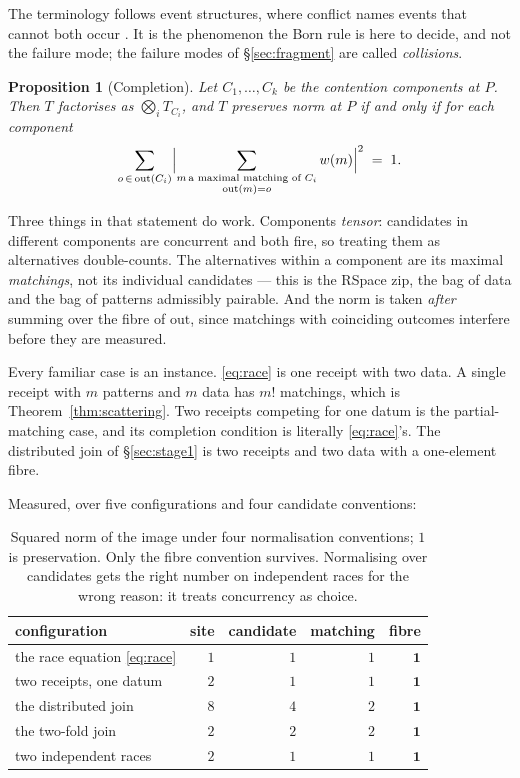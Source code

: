 \documentclass[11pt,a4paper]{article}
\theoremstyle{plain}
\newtheorem{proposition}[theorem]{Proposition}
\theoremstyle{definition}
\theoremstyle{remark}
\newcommand{\Out}{\mathrm{out}}
\begin{document}
The terminology follows event structures, where conflict names events that
cannot both occur \cite{Winskel}. It is the phenomenon the Born rule is here to
decide, and not the failure mode; the failure modes of \S\ref{sec:fragment} are
called \emph{collisions}.

\begin{proposition}[Completion]\label{prop:complete}
Let $C_1,\dots,C_k$ be the contention components at $P$. Then $T$ factorises as
$\bigotimes_i T_{C_i}$, and $T$ preserves norm at $P$ if and only if for each
component
\[
  \sum_{o \,\in\, \Out(C_i)}
  \Bigl| \sum_{\substack{m \,\text{a maximal matching of } C_i\\ \Out(m) = o}}
          w(m) \Bigr|^{2} \;=\; 1 .
\]
\end{proposition}

Three things in that statement do work. Components \emph{tensor}: candidates in
different components are concurrent and both fire, so treating them as
alternatives double-counts. The alternatives within a component are its maximal
\emph{matchings}, not its individual candidates --- this is the RSpace zip, the
bag of data and the bag of patterns admissibly pairable. And the norm is taken
\emph{after} summing over the fibre of $\Out$, since matchings with coinciding
outcomes interfere before they are measured.

Every familiar case is an instance. \eqref{eq:race} is one receipt with two
data. A single receipt with $m$ patterns and $m$ data has $m!$ matchings, which
is Theorem~\ref{thm:scattering}. Two receipts competing for one datum is the
partial-matching case, and its completion condition is literally
\eqref{eq:race}'s. The distributed join of \S\ref{sec:stage1} is two receipts
and two data with a one-element fibre.

Measured, over five configurations and four candidate conventions:

\begin{table}[h]
\centering\small
\begin{tabular}{@{}lrrrr@{}}
\toprule
configuration & site & candidate & matching & \textbf{fibre} \\
\midrule
the race equation \eqref{eq:race}     & $1$ & $1$ & $1$ & $\mathbf{1}$ \\
two receipts, one datum               & $2$ & $1$ & $1$ & $\mathbf{1}$ \\
the distributed join                  & $8$ & $4$ & $2$ & $\mathbf{1}$ \\
the two-fold join                     & $2$ & $2$ & $2$ & $\mathbf{1}$ \\
two independent races                 & $2$ & $1$ & $1$ & $\mathbf{1}$ \\
\bottomrule
\end{tabular}
\caption{Squared norm of the image under four normalisation conventions;
$1$ is preservation. Only the fibre convention survives. Normalising over
candidates gets the right number on independent races for the wrong reason: it
treats concurrency as choice.}\label{tab:conventions}
\end{table}
\end{document}
